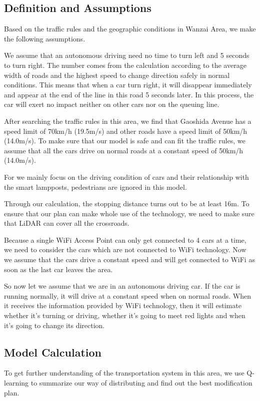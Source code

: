 \documentclass[12pt]{article}
\theoremstyle{definition}
\theoremstyle{remark}
\numberwithin{equation}{section}
\begin{document}
		\subsection{Definition and Assumptions}
		Based on the traffic rules and the geographic conditions in Wanzai Area, we make the following assumptions.
		\begin{compactenum}[1, ]
		\item We assume that an autonomous driving need no time to turn left and 5 seconds to turn right. The number comes from the calculation according to the average width of roads and the highest speed to change direction safely in normal conditions. This means that when a car turn right, it will disappear immediately and appear at the end of the line in this road 5 seconds later. In this process, the car will exert no impact neither on other cars nor on the queuing line.
		\item After searching the traffic rules in this area, we find that Gaoshida Avenue has a speed limit of 70km/h (19.5m/s) and other roads have a speed limit of 50km/h (14.0m/s). To make sure that our model is safe and can fit the traffic rules, we assume that all the cars drive on normal roads at a constant speed of 50km/h (14.0m/s).
		\item For we mainly focus on the driving condition of cars and their relationship with the smart lampposts, pedestrians are ignored in this model.		
		\item Through our calculation, the stopping distance turns out to be at least 16m. To ensure that our plan can make whole use of the technology, we need to make sure that LiDAR can cover all the crossroads.
		\item Because a single WiFi Access Point can only get connected to 4 cars at a time, we need to consider the cars which are not connected to WiFi technology. Now we assume that the cars drive a  constant speed and will get connected to WiFi as soon as the last car leaves the area.
		\end{compactenum}
		So now let we assume that we are in an autonomous driving car. If the car is running normally, it will drive at a constant speed when on normal roads. When it receives the information provided by WiFi technology, then it will estimate whether it's turning or driving, whether it's going to meet red lights and when it's going to change its direction.
		

	
		\subsection{Model Calculation}
		To get further understanding of the transportation system in this area, we use Q-learning to summarize our way of distributing and find out the best modification plan.
		
\end{document}
